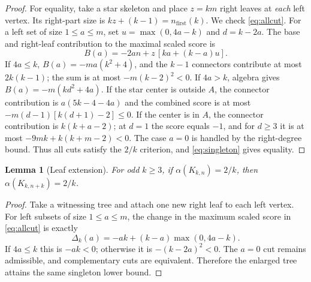 \documentclass[11pt,a4paper]{article}
\newtheorem{lemma}[theorem]{Lemma}
\newcommand{\al}{\alpha}
\newcommand{\KK}[2]{K_{#1,#2}}
\begin{document}
\begin{proof}
For equality, take a star skeleton and place $z=km$ right leaves at \emph{each} left vertex. Its right-part size is $kz+(k-1)=n_{\mathrm{first}}(k)$. We check \eqref{eq:allcut}. For a left set of size $1\le a\le m$, set $u=\max(0,4a-k)$ and $d=k-2a$. The base and right-leaf contribution to the maximal scaled score is
\[
B(a)=-2an+z\,[ka+(k-a)u].
\]
If $4a\le k$, $B(a)=-ma(k^2+4)$, and the $k-1$ connectors contribute at most $2k(k-1)$; the sum is at most $-m(k-2)^2<0$. If $4a>k$, algebra gives $B(a)=-m(kd^2+4a)$. If the star center is outside $A$, the connector contribution is $a(5k-4-4a)$ and the combined score is at most $-m(d-1)[k(d+1)-2]\le0$. If the center is in $A$, the connector contribution is $k(k+a-2)$; at $d=1$ the score equals $-1$, and for $d\ge3$ it is at most $-9mk+k(k+m-2)<0$. The case $a=0$ is handled by the right-degree bound. Thus all cuts satisfy the $2/k$ criterion, and \eqref{eq:singleton} gives equality. 
\end{proof}
\begin{lemma}[Leaf extension]\label{lem:extension}
For odd $k\ge3$, if $\al(\KK{k}{n})=2/k$, then $\al(\KK{k}{n+k})=2/k$.
\end{lemma}
\begin{proof}
Take a witnessing tree and attach one new right leaf to each left vertex. For left subsets of size $1\le a\le m$, the change in the maximum scaled score in \eqref{eq:allcut} is exactly
\[
\Delta_k(a)=-ak+(k-a)\max(0,4a-k).
\]
If $4a\le k$ this is $-ak<0$; otherwise it is $-(k-2a)^2<0$. The $a=0$ cut remains admissible, and complementary cuts are equivalent. Therefore the enlarged tree attains the same singleton lower bound.\end{proof}
\end{document}
